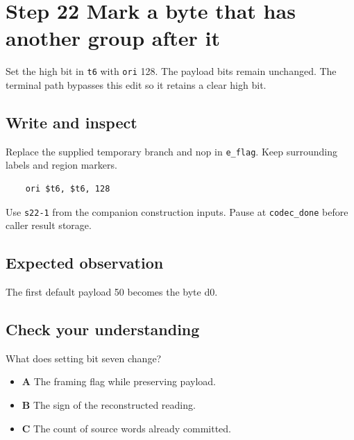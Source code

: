 \section{Step 22 Mark a byte that has another group after it}\label{delta-s22}

Set the high bit in \texttt{t6} with \texttt{ori} 128. The payload bits remain unchanged. The terminal path bypasses this edit so it retains a clear high bit.

\subsection{Write and inspect}
Replace the supplied temporary branch and nop in \texttt{e\_flag}. Keep surrounding labels and region markers.

\begin{verbatim}
    ori $t6, $t6, 128
\end{verbatim}
Use \texttt{s22-1} from the companion construction inputs. Pause at \texttt{codec\_done} before caller result storage.

\subsection{Expected observation}
The first default payload 50 becomes the byte d0.

\subsection{Check your understanding}
What does setting bit seven change?

\begin{itemize}
\item \textbf{A} The framing flag while preserving payload.
\item \textbf{B} The sign of the reconstructed reading.
\item \textbf{C} The count of source words already committed.
\end{itemize}
